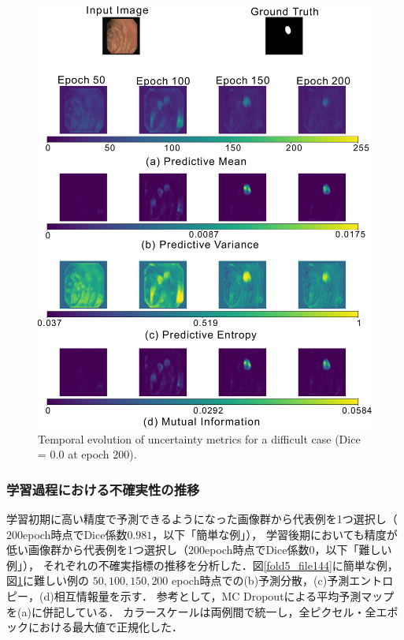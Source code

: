 \documentclass[10pt, a4paper, twocolumn]{jarticle}
\begin{document}
\begin{figure}[t] %
  \begin{center}
    \includegraphics[width=\hsize]{figure/fold2_file450_uncertainty_evolution.pdf}
    \caption{Temporal evolution of uncertainty metrics for a difficult case (Dice = $0.0$ at epoch $200$).}
    \label{fold2_file450}
  \end{center}
\end{figure}


\subsubsection{学習過程における不確実性の推移}
学習初期に高い精度で予測できるようになった画像群から代表例を1つ選択し（$200$epoch時点でDice係数$0.981$，以下「簡単な例」），
学習後期においても精度が低い画像群から代表例を1つ選択し（$200$epoch時点でDice係数$0$，以下「難しい例」），
それぞれの不確実指標の推移を分析した．図\ref{fold5_file144}に簡単な例，図\ref{fold2_file450}に難しい例の
$50, 100, 150, 200$ epoch時点での(b)予測分散，(c)予測エントロピー，(d)相互情報量を示す．
参考として，MC Dropoutによる平均予測マップを(a)に併記している．
カラースケールは両例間で統一し，全ピクセル・全エポックにおける最大値で正規化した．
\end{document}
